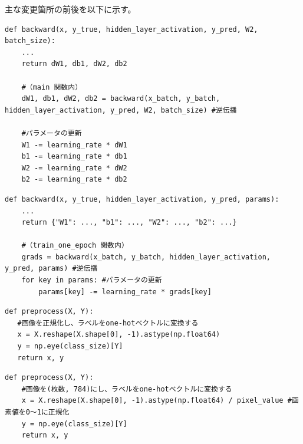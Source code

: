 \documentclass[a4paper,11pt]{ltjsarticle}
\begin{document}
主な変更箇所の前後を以下に示す。

\begin{lstlisting}[style=before, caption={【前】パラメータを4つの変数で受け渡す}, label=lst:k3b1]
def backward(x, y_true, hidden_layer_activation, y_pred, W2, batch_size):
    ...
    return dW1, db1, dW2, db2

    #（main 関数内）
    dW1, db1, dW2, db2 = backward(x_batch, y_batch, hidden_layer_activation, y_pred, W2, batch_size) #逆伝播

    #パラメータの更新
    W1 -= learning_rate * dW1
    b1 -= learning_rate * db1
    W2 -= learning_rate * dW2
    b2 -= learning_rate * db2
\end{lstlisting}

\begin{lstlisting}[style=after, caption={【後】パラメータと勾配を辞書で受け渡す}, label=lst:k3a1]
def backward(x, y_true, hidden_layer_activation, y_pred, params):
    ...
    return {"W1": ..., "b1": ..., "W2": ..., "b2": ...}

    #（train_one_epoch 関数内）
    grads = backward(x_batch, y_batch, hidden_layer_activation, y_pred, params) #逆伝播
    for key in params: #パラメータの更新
        params[key] -= learning_rate * grads[key]
\end{lstlisting}

\begin{lstlisting}[style=before, caption={【前】コメントと処理が食い違っている前処理}, label=lst:k3b2]
def preprocess(X, Y):
   #画像を正規化し、ラベルをone-hotベクトルに変換する
   x = X.reshape(X.shape[0], -1).astype(np.float64)
   y = np.eye(class_size)[Y]
   return x, y
\end{lstlisting}

\begin{lstlisting}[style=after, caption={【後】画素値を255で割って正規化する}, label=lst:k3a2]
def preprocess(X, Y):
    #画像を(枚数, 784)にし、ラベルをone-hotベクトルに変換する
    x = X.reshape(X.shape[0], -1).astype(np.float64) / pixel_value #画素値を0〜1に正規化
    y = np.eye(class_size)[Y]
    return x, y
\end{lstlisting}
\end{document}
